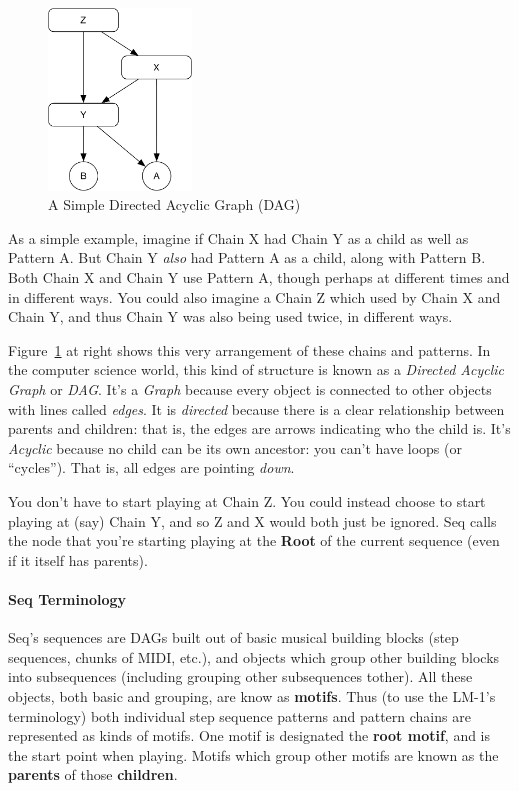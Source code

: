\documentclass[twoside,10pt]{article}
\begin{document}
\begin{figure}
\vspace{-1em}
\includegraphics[width=1.5in]{dag}
\caption{A Simple Directed Acyclic Graph (DAG)}
\label{dag}
\end{figure}

As a simple example, imagine if Chain X had Chain Y as a child as well as Pattern A.  But Chain Y {\it also} had Pattern A as a child, along with Pattern B.  Both Chain X and Chain Y use Pattern A, though perhaps at different times and in different ways.  You could also imagine a Chain Z which used by Chain X and Chain Y, and thus Chain Y was also being used twice, in different ways.

Figure~\ref{dag} at right shows this very arrangement of these chains and patterns. In the computer science world, this kind of structure is known as a {\it Directed Acyclic Graph} or {\it DAG}.  It's a {\it Graph} because every object is connected to other objects with lines called {\it edges}.  It is {\it directed} because there is a clear relationship between parents and children: that is, the edges are arrows indicating who the child is.  It's {\it Acyclic} because no child can be its own ancestor: you can't have loops (or ``cycles'').  That is, all edges are pointing {\it down}.

You don't have to start playing at Chain Z.  You could instead choose to start playing at (say) Chain Y, and so Z and X would both just be ignored.  Seq calls the node that you're starting playing at the {\bf Root} of the current sequence (even if it itself has parents).

\paragraph{Seq Terminology}

Seq's sequences are DAGs built out of basic musical building blocks (step sequences, chunks of MIDI, etc.), and objects which group other building blocks into subsequences (including grouping other subsequences tother).  All these objects, both basic and grouping, are know as {\bf motifs}.  Thus (to use the LM-1's terminology) both individual step sequence patterns and pattern chains are represented as kinds of motifs.  One motif is designated the {\bf root motif}, and is the start point when playing.  Motifs which group other motifs are known as the {\bf parents} of those {\bf children}.  
\end{document}
